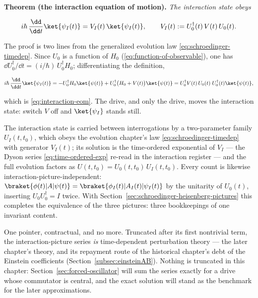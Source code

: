 \medskip\noindent\textbf{Theorem (the interaction equation of motion).} \emph{The interaction state obeys}
\begin{linenomath}
    \begin{equation}
        i\hbar\,\frac{\dd}{\dd t}\ket{\psi_I(t)} = V_I(t)\,\ket{\psi_I(t)}, \qquad V_I(t) := U_0^\dagger(t)\,V(t)\,U_0(t) .
        \label{eq:interaction-eom}
    \end{equation}
\end{linenomath}
The proof is two lines from the generalized evolution law \eqref{eq:schroedinger-timedep}. Since $U_0$ is a function of $H_0$ (\eqref{eq:function-of-observable}), one has $\dd U_0^\dagger/\dd t = (i/\hbar)\,U_0^\dagger H_0$; differentiating the definition,
\begin{linenomath}
    \begin{equation*}
        i\hbar\,\frac{\dd}{\dd t}\ket{\psi_I(t)} = -U_0^\dagger H_0\ket{\psi(t)} + U_0^\dagger\bigl(H_0 + V(t)\bigr)\ket{\psi(t)} = U_0^\dagger V(t)\,U_0(t)\;U_0^\dagger(t)\ket{\psi(t)},
    \end{equation*}
\end{linenomath}
which is \eqref{eq:interaction-eom}. The drive, and only the drive, moves the interaction state: switch $V$ off and $\ket{\psi_I}$ stands still.

The interaction state is carried between interrogations by a two-parameter family $U_I(t, t_0)$, which obeys the evolution chapter's law \eqref{eq:schroedinger-timedep} with generator $V_I(t)$; its solution is the time-ordered exponential of $V_I$ --- the Dyson series \eqref{eq:time-ordered-exp} re-read in the interaction register --- and the full evolution factors as $U(t, t_0) = U_0(t, t_0)\,U_I(t, t_0)$. Every count is likewise interaction-picture-independent: $\braket{\phi(t)|A|\psi(t)} = \braket{\phi_I(t)|A_I(t)|\psi_I(t)}$ by the unitarity of $U_0(t)$, inserting $U_0U_0^\dagger = I$ twice. With Section~\ref{sec:schroedinger-heisenberg-pictures} this completes the equivalence of the three pictures: three bookkeepings of one invariant content.

One pointer, contractual, and no more. Truncated after its first nontrivial term, the interaction-picture series \emph{is} time-dependent perturbation theory --- the later chapter's theory, and its repayment route of the historical chapter's debt of the Einstein coefficients (Section~\ref{subsec:einsteinAB}). Nothing is truncated in this chapter: Section~\ref{sec:forced-oscillator} will sum the series exactly for a drive whose commutator is central, and the exact solution will stand as the benchmark for the later approximations.

